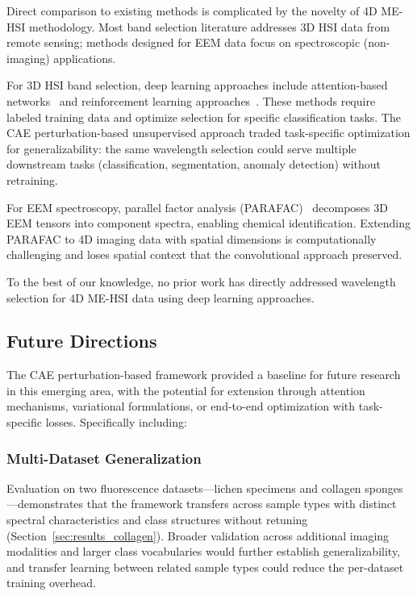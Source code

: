 Direct comparison to existing methods is complicated by the novelty of 4D ME-HSI methodology.
Most band selection literature addresses 3D HSI data from remote sensing; methods designed for EEM data focus on spectroscopic (non-imaging) applications.

For 3D HSI band selection, deep learning approaches include attention-based networks~\cite{mou2017deep} and reinforcement learning approaches~\cite{roy2020hybridsn}.
These methods require labeled training data and optimize selection for specific classification tasks.
The CAE perturbation-based unsupervised approach traded task-specific optimization for generalizability: the same wavelength selection could serve multiple downstream tasks (classification, segmentation, anomaly detection) without retraining.

For EEM spectroscopy, parallel factor analysis (PARAFAC)~\cite{bro1997parafac} decomposes 3D EEM tensors into component spectra, enabling chemical identification.
Extending PARAFAC to 4D imaging data with spatial dimensions is computationally challenging and loses spatial context that the convolutional approach preserved.

To the best of our knowledge, no prior work has directly addressed wavelength selection for 4D ME-HSI data using deep learning approaches.


\subsection{Future Directions}
\label{sec:future_work}

The CAE perturbation-based framework provided a baseline for future research in this emerging area, with the potential for extension through attention mechanisms, variational formulations, or end-to-end optimization with task-specific losses. Specifically including: 
\subsubsection{Multi-Dataset Generalization}
Evaluation on two fluorescence datasets---lichen specimens and collagen
sponges---demonstrates that the framework transfers across sample types with
distinct spectral characteristics and class structures without retuning
(Section~\ref{sec:results_collagen}). Broader validation across additional
imaging modalities and larger class vocabularies would further establish
generalizability, and transfer learning between related sample types could
reduce the per-dataset training overhead.

